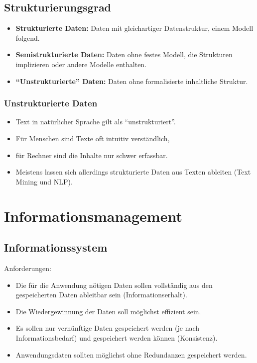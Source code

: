        \subsection{Strukturierungsgrad} %
            \begin{itemize}
            	\item \textbf{Strukturierte Daten:} Daten mit gleichartiger Datenstruktur, einem Modell folgend.
            	\item \textbf{Semistrukturierte Daten:} Daten ohne festes Modell, die Strukturen implizieren oder andere Modelle enthalten.
            	\item \textbf{\enquote{Unstrukturierte} Daten:} Daten ohne formalisierte inhaltliche Struktur.
            \end{itemize}

            \subsubsection{Unstrukturierte Daten} %
                \begin{itemize}
                	\item Text in natürlicher Sprache gilt als \enquote{unstrukturiert}.
                	\item Für Menschen sind Texte oft intuitiv verständlich,
                	\item für Rechner sind die Inhalte nur schwer erfassbar.
                	\item Meistens lassen sich allerdings strukturierte Daten aus Texten ableiten (Text Mining und NLP).
                \end{itemize}

    \section{Informationsmanagement} %
        \subsection{Informationssystem} %
        	Anforderungen:
            \begin{itemize}
            	\item Die für die Anwendung nötigen Daten sollen vollständig aus den gespeicherten Daten ableitbar sein (Informationserhalt).
            	\item Die Wiedergewinnung der Daten soll möglichst effizient sein.
            	\item Es sollen nur vernünftige Daten gespeichert werden (je nach Informationsbedarf) und gespeichert werden können (Konsistenz).
            	\item Anwendungsdaten sollten möglichst ohne Redundanzen gespeichert werden.
            \end{itemize}

